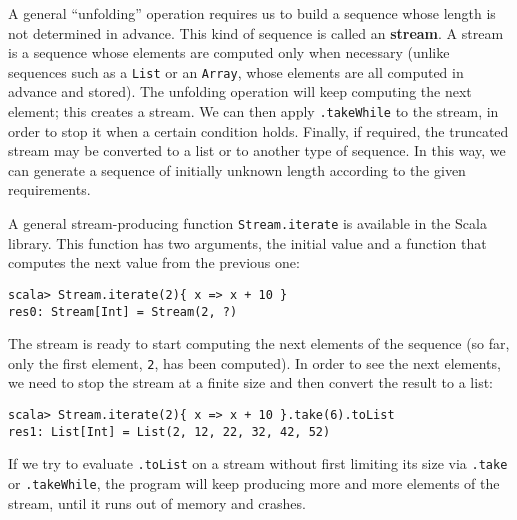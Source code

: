 A general ``unfolding'' operation requires us to build a sequence
whose length is not determined in advance. This kind of sequence is
called an \textbf{stream}. A stream is a sequence whose
elements are computed only when necessary (unlike sequences such as
a \lstinline!List! or an
\lstinline!Array!, whose
elements are all computed in advance and stored). The unfolding operation
will keep computing the next element; this creates a stream. We can
then apply \lstinline!.takeWhile!
to the stream, in order to stop it when a certain condition holds.
Finally, if required, the truncated stream may be converted to a list
or to another type of sequence. In this way, we can generate a sequence
of initially unknown length according to the given requirements.

A general stream-producing function \lstinline!Stream.iterate!
is available in the Scala library. This function has two arguments,
the initial value and a function that computes the next value from
the previous one:
\begin{lstlisting}
scala> Stream.iterate(2){ x => x + 10 }
res0: Stream[Int] = Stream(2, ?)
\end{lstlisting}
The stream is ready to start computing the next elements of the sequence
(so far, only the first element, \lstinline!2!,
has been computed). In order to see the next elements, we need to
stop the stream at a finite size and then convert the result to a
list:
\begin{lstlisting}
scala> Stream.iterate(2){ x => x + 10 }.take(6).toList
res1: List[Int] = List(2, 12, 22, 32, 42, 52)
\end{lstlisting}
If we try to evaluate \lstinline!.toList!
on a stream without first limiting its size via \lstinline!.take!
or \lstinline!.takeWhile!,
the program will keep producing more and more elements of the stream,
until it runs out of memory and crashes.

